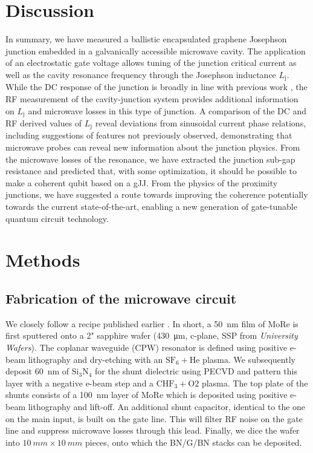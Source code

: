 \section{Discussion}

In summary, we have measured a ballistic encapsulated graphene Josephson junction embedded in a galvanically accessible microwave cavity.
The application of an electrostatic gate voltage allows tuning of the junction critical current as well as the cavity resonance frequency through the Josephson inductance $L_\textrm{j}$.
While the DC response of the junction is broadly in line with previous work \cite{calado_ballistic_2015a,benshalom_quantum_2015,lee_ultimately_2015}, the RF measurement of the cavity-junction system provides additional information on $L_\textrm{j}$ and microwave losses in this type of junction.
A comparison of the DC and RF derived values of $L_\textrm{j}$ reveal deviations from sinusoidal current phase relations, including suggestions of features not previously observed, demonstrating that microwave probes can reveal new information about the junction physics. 
From the microwave losses of the resonance, we have extracted the junction sub-gap resistance and predicted that, with some optimization, it should be possible to make a coherent qubit based on a gJJ.
From the physics of the proximity junctions, we have suggested a route towards improving the coherence potentially towards the current state-of-the-art, enabling a new generation of gate-tunable quantum circuit technology. 


\section*{Methods}
\subsection*{Fabrication of the microwave circuit}
We closely follow a recipe published earlier \cite{bosman_broadband_2015,singh_molybdenumrhenium_2014}.
In short, a \SI{50}{nm} film of MoRe is first sputtered onto a 2" sapphire wafer (\SI{430}{\micro m}, c-plane, SSP from \textit{University Wafers}).
The coplanar waveguide (CPW) resonator is defined using positive e-beam lithography and dry-etching with an $\mathrm{SF_6 + He}$ plasma.
We subsequently deposit \SI{60}{nm} of $\mathrm{Si_3N_4}$ for the shunt dielectric using PECVD and pattern this layer with a negative e-beam step and a $\mathrm{CHF_3 + O2}$ plasma.
The top plate of the shunts consists of a \SI{100}{nm} layer of MoRe which is deposited using positive e-beam lithography and lift-off.
An additional shunt capacitor, identical to the one on the main input, is built on the gate line.
This will filter RF noise on the gate line and suppress microwave losses through this lead.
Finally, we dice the wafer into $\SI{10}{mm}\times\SI{10}{mm}$ pieces, onto which the BN/G/BN stacks can be deposited.

